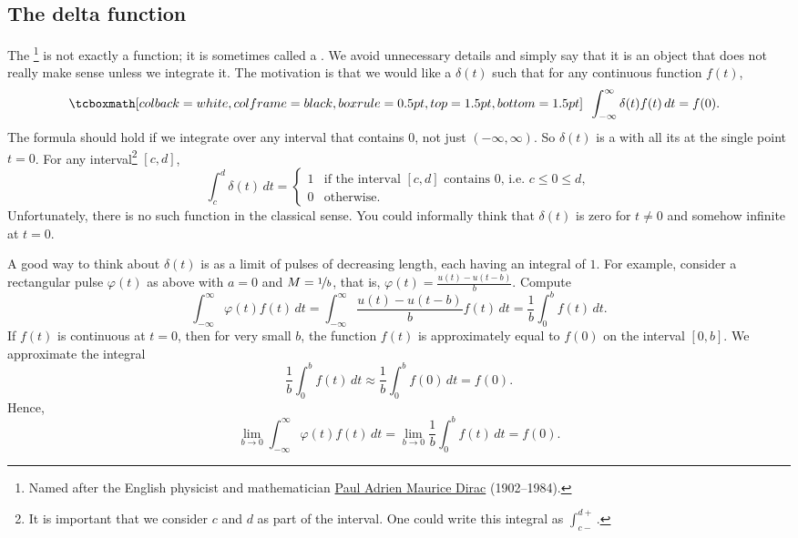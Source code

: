 \subsection{The delta function}

The \emph{}%
\footnote{Named after the English physicist and mathematician
\href{https://en.wikipedia.org/wiki/Paul_Dirac}{Paul Adrien Maurice Dirac}
(1902--1984).}
is not exactly a function; it is sometimes called a
\emph{}.  We
avoid unnecessary details and simply say that it is an object
that does not really make sense unless we integrate it.  The motivation is
that we would like a  $\delta(t)$
such that 
for any continuous function $f(t)$,
\begin{equation*}
\mybxbg{~~
\int_{-\infty}^\infty \delta(t) f(t) \,dt = f(0) .
~~}
\end{equation*}
The formula should hold if we integrate over any interval that contains 0,
not just $(-\infty,\infty)$.
So $\delta(t)$ is a  
with all its  at the single point $t=0$.  For any
interval\footnote{%
It is important that we consider $c$ and $d$ as part of the
interval.  One could write this integral as $\int_{c-}^{d+}$.}
$[c,d]$,
\begin{equation*}
\int_c^d \delta(t) \,dt = 
\begin{cases}
1 & \text{if the interval $[c,d]$ contains 0, i.e.\ } c \leq 0 \leq d, \\
0 & \text{otherwise.}
\end{cases}
\end{equation*}
Unfortunately, there is no such function in the classical sense.  You could
informally think that $\delta(t)$ is zero for $t \neq 0$ and somehow
infinite at $t=0$.

A good way to think about $\delta(t)$ is as a limit of pulses
of decreasing length,
each having an integral of $1$.  For example, 
consider a rectangular pulse
$\varphi(t)$ as above with $a=0$ and
$M=\nicefrac{1}{b}$, that is, $\varphi(t) = \frac{u(t) - u(t-b)}{b}$.
Compute
\begin{equation*}
\int_{-\infty}^\infty \varphi(t) f(t) \,dt =
\int_{-\infty}^\infty \frac{u(t) - u(t-b)}{b} f(t) \,dt =
\frac{1}{b} \int_{0}^b f(t) \,dt .
\end{equation*}
If $f(t)$ is continuous at $t=0$, then
for very small $b$, the function $f(t)$ is approximately equal to $f(0)$ on
the interval $[0,b]$.  We approximate the integral
\begin{equation*}
\frac{1}{b} \int_{0}^b f(t) \,dt \approx
\frac{1}{b} \int_{0}^b f(0) \,dt = f(0) .
\end{equation*}
Hence,
\begin{equation*}
\lim_{b\to 0}
\int_{-\infty}^\infty \varphi(t) f(t) \,dt =
\lim_{b\to 0}
\frac{1}{b} \int_{0}^b f(t) \,dt  = f(0) .
\end{equation*}

